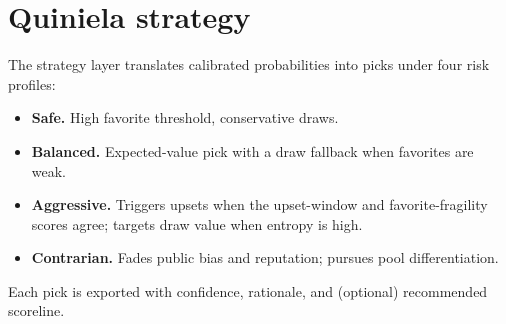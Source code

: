 \section{Quiniela strategy}
The strategy layer translates calibrated probabilities into picks under four
risk profiles:
\begin{itemize}
  \item \textbf{Safe.} High favorite threshold, conservative draws.
  \item \textbf{Balanced.} Expected-value pick with a draw fallback when
        favorites are weak.
  \item \textbf{Aggressive.} Triggers upsets when the upset-window and
        favorite-fragility scores agree; targets draw value when entropy is
        high.
  \item \textbf{Contrarian.} Fades public bias and reputation; pursues pool
        differentiation.
\end{itemize}
Each pick is exported with confidence, rationale, and (optional) recommended
scoreline.
